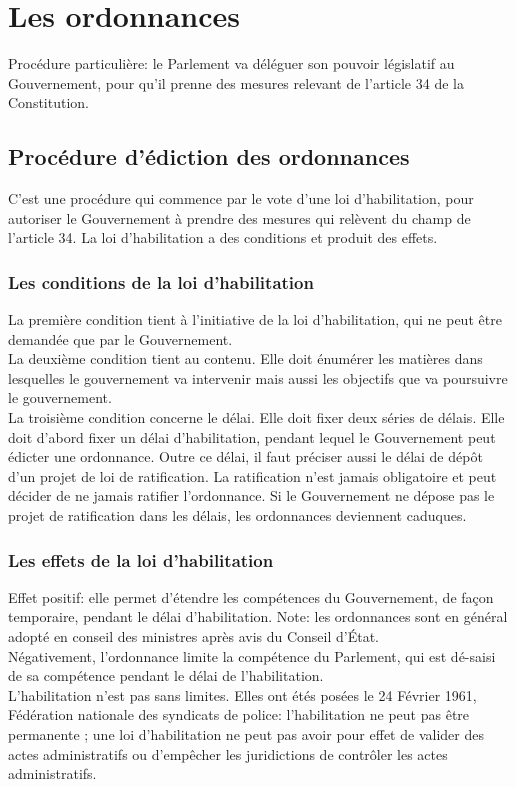 \documentclass[10pt, a4paper, openany]{book}
\begin{document}
\section{Les ordonnances}

Procédure particulière: le Parlement va déléguer son pouvoir législatif au Gouvernement, pour qu'il prenne des mesures relevant de l'article 34 de la Constitution. 

\subsection{Procédure d'édiction des ordonnances}

C'est une procédure qui commence par le vote d'une loi d'habilitation, pour autoriser le Gouvernement à prendre des mesures qui relèvent du champ de l'article 34. La loi d'habilitation a des conditions et produit des effets.

\subsubsection{Les conditions de la loi d'habilitation}

La première condition tient à l'initiative de la loi d'habilitation, qui ne peut être demandée que par le Gouvernement. \\
La deuxième condition tient au contenu. Elle doit énumérer les matières dans lesquelles le gouvernement va intervenir mais aussi les objectifs que va poursuivre le gouvernement. \\
La troisième condition concerne le délai. Elle doit fixer deux séries de délais. Elle doit d'abord fixer un délai d'habilitation, pendant lequel le Gouvernement peut édicter une ordonnance. Outre ce délai, il faut préciser aussi le délai de dépôt d'un projet de loi de ratification. La ratification n'est jamais obligatoire et peut décider de ne jamais ratifier l'ordonnance. Si le Gouvernement ne dépose pas le projet de ratification dans les délais, les ordonnances deviennent caduques. 

\subsubsection{Les effets de la loi d'habilitation}

Effet positif: elle permet d'étendre les compétences du Gouvernement, de façon temporaire, pendant le délai d'habilitation. Note: les ordonnances sont en général adopté en conseil des ministres après avis du Conseil d'État. \\
Négativement, l'ordonnance limite la compétence du Parlement, qui est dé-saisi de sa compétence pendant le délai de l'habilitation. \\
L'habilitation n'est pas sans limites. Elles ont étés posées le 24 Février 1961, Fédération nationale des syndicats de police: l'habilitation ne peut pas être permanente ; une loi d'habilitation ne peut pas avoir pour effet de valider des actes administratifs ou d'empêcher les juridictions de contrôler les actes administratifs. 
\end{document}
